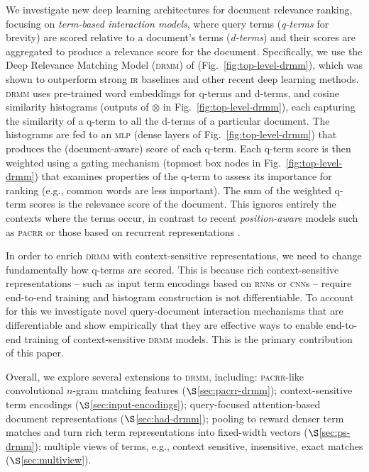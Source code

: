 \documentclass[11pt,a4paper]{article}
\newcommand{\mlp}{\textsc{mlp}\xspace}
\newcommand{\rnn}{\textsc{rnn}\xspace}
\newcommand{\cnn}{\textsc{cnn}\xspace}
\newcommand{\ir}{\textsc{ir}\xspace}
\newcommand{\drmm}{\textsc{drmm}\xspace}
\newcommand{\pacrr}{\textsc{pacrr}\xspace}
\begin{document}
We investigate new deep learning architectures for document relevance ranking, focusing on 
\emph{term-based interaction models}, where
query terms (\emph{q-terms} for brevity) are scored relative to a document's terms (\emph{d-terms}) and their scores are aggregated to produce a relevance score for the document. Specifically, we use the Deep Relevance Matching Model (\drmm) of  (Fig.~\ref{fig:top-level-drmm}), which was shown to outperform  
strong \ir baselines and other recent deep learning methods. 
\drmm uses pre-trained word embeddings for 
q-terms and d-terms, and cosine similarity histograms (outputs of $\otimes$ in Fig.~\ref{fig:top-level-drmm}), each capturing the similarity of a 
q-term to all the d-terms of a particular document. 
The histograms are fed to an \mlp
(dense layers of Fig.~\ref{fig:top-level-drmm})
that produces the (document-aware) score of each q-term.
Each q-term score is then weighted using a gating mechanism (topmost box nodes in Fig.~\ref{fig:top-level-drmm}) that examines properties of the q-term to assess its importance for ranking (e.g., common words are less important). The sum of the weighted q-term scores is the relevance score of the document.
This ignores entirely the contexts where the terms occur, in contrast to recent \emph{position-aware} models such as \pacrr \cite{hui2017pacrr} or those based on recurrent representations \cite{palangi2016deep}.

In order to enrich \drmm with context-sensitive representations, we need to change fundamentally how q-terms are scored. This is because rich context-sensitive representations -- such as input term encodings based on \rnn{s} or \cnn{s} -- require end-to-end training and histogram construction is not differentiable. To account for this we investigate novel query-document interaction mechanisms that are differentiable and show empirically that they are effective ways to enable end-to-end training of context-sensitive \drmm models. This is the primary contribution of this paper.

Overall, we explore several extensions to \drmm, including: \pacrr-like convolutional $n$-gram matching
features ($\S$\ref{sec:pacrr-drmm});
context-sensitive term encodings ($\S$\ref{sec:input-encodings}); 
query-focused attention-based document representations ($\S$\ref{sec:had-drmm});
pooling to reward denser term matches and turn rich term representations into fixed-width vectors ($\S$\ref{sec:ps-drmm});
multiple views of terms, e.g., context sensitive, insensitive, exact matches ($\S$\ref{sec:multiview}).
\end{document}
